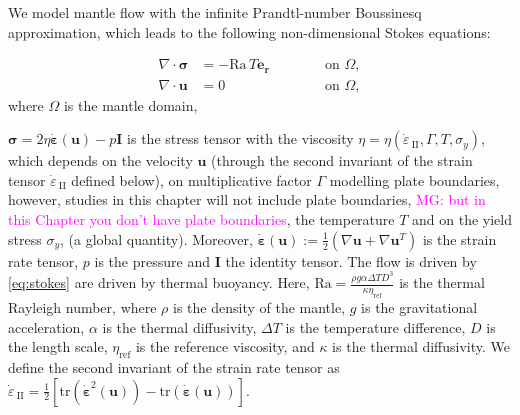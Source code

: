\documentclass[12pt]{article}
\newcommand{\mgnote}[1]{\textcolor{magenta}{MG: #1}}
\newcommand{\gsnote}[1]{\textcolor{blue}{GS: #1}}
\newcommand{\vrnote}[1]{\textcolor{red}{VR: #1}}
\newcommand{\IIinv}{{\dot\varepsilon}_{\mathrm{\!\!\:II}}}
\newcommand{\uu}{{\ensuremath{\boldsymbol{u}}}}
\newcommand{\ssigma}{{\ensuremath{\boldsymbol{\sigma}}}}
\newcommand{\strain}{{\ensuremath{\dot{\boldsymbol{\varepsilon}}}}}
\begin{document}
We model mantle flow with the infinite Prandtl-number Boussinesq
approximation, which leads to the following non-dimensional Stokes
equations:

\begin{subequations}    \label{eq:stokes}
  \label{eq:forward_model}
  \begin{alignat}{2}
    \label{eq:stokes1}
    \nabla \cdot \ssigma &= -\text{Ra}
    \,T\textbf{e}_\textbf{r} \qquad &&\text{ on }\Omega, \\
    \label{eq:incompress}
    \nabla \cdot \uu &= 0 \qquad &&\text{ on } \Omega,
  \end{alignat}
\end{subequations} 
where $\Omega$ is the mantle domain,

$\ssigma = 2\eta\strain(\uu) - p\textbf{I}$ is the stress tensor
 with the viscosity $\eta=\eta(\IIinv, \Gamma, T,
\sigma_y)$, which depends on the velocity $\uu$ (through the
second invariant of the strain tensor $\IIinv$ defined below), on
multiplicative factor $\Gamma$ modelling plate boundaries, however, studies in this chapter will not include plate boundaries, \mgnote{but in this Chapter you don't have plate boundaries},
 the temperature $T$ and on
the yield stress $\sigma_y$, (a global quantity). Moreover,
$\strain(\uu):=\frac{1}{2} (\nabla \uu + \nabla
\uu^T)$ is the strain rate tensor, $p$ is the pressure and
\textbf{I} the identity tensor. The flow is driven by
\eqref{eq:stokes} are driven by thermal buoyancy. Here,
$\text{Ra}=\frac{\rho g \alpha \Delta T D^3}{\kappa
  \eta_{\text{ref}}}$ is the thermal Rayleigh number,
where $\rho$ is the density of the mantle, $g$ is the
gravitational acceleration, $\alpha$ is the thermal
diffusivity, $\Delta T$ is the temperature difference, $D$ is the length scale,
$\eta_{\text{ref}}$ is the reference viscosity, and $\kappa$ is the
thermal diffusivity.
We define the second invariant of the strain rate tensor 
as $\IIinv  = \frac{1}{2}[\text{tr}(\strain^2 (\uu)) -\text{tr}(\strain(\uu))]$. 
\end{document}

